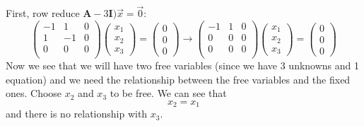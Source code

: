\documentclass[12pts]{exam}
\newcommand{\ve}[1]{\ensuremath{\mathbf{#1}}}
\begin{document}
\begin{questions}
\begin{solution}
\begin{parts}
First, row reduce $\ve{A} - 3 \ve{I})\vec{x} = \vec{0}$:
%
\begin{equation}
\begin{pmatrix}
   -1 &  1 & 0 \\
    1 & -1 & 0 \\
    0 &  0 & 0 \\
\end{pmatrix}  
\begin{pmatrix}
x_1 \\ x_2 \\ x_3
\end{pmatrix}  = 
\begin{pmatrix}
0 \\ 0 \\ 0
\end{pmatrix}
%
\rightarrow
%
\begin{pmatrix}
   -1 &  1 & 0 \\
    0 & 0 & 0 \\
    0 &  0 & 0 \\
\end{pmatrix}  
\begin{pmatrix}
x_1 \\ x_2 \\ x_3
\end{pmatrix}  = 
\begin{pmatrix}
0 \\ 0 \\ 0
\end{pmatrix} \nonumber
\end{equation}
%
Now we see that we will have two free variables (since we have 3 unknowns and 1 equation) and we need the relationship between the free variables and the fixed ones. Choose $x_2$ and $x_3$ to be free. We can see that
\[x_2 = x_1\]
and there is no relationship with $x_3$. 


\end{parts}
\end{solution}
\end{questions}
\end{document}
